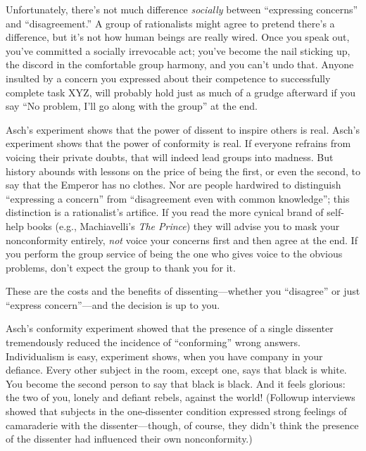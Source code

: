 {
 Unfortunately, there's not much difference
\textit{socially} between ``expressing
concerns'' and
``disagreement.'' A group of
rationalists might agree to pretend there's a
difference, but it's not how human beings are really
wired. Once you speak out, you've committed a socially
irrevocable act; you've become the nail sticking up,
the discord in the comfortable group harmony, and you
can't undo that. Anyone insulted by a concern you
expressed about their competence to successfully complete task XYZ,
will probably hold just as much of a grudge afterward if you say
``No problem, I'll go along with the
group'' at the end.}

{
 Asch's experiment shows that the power of dissent
to inspire others is real. Asch's experiment shows that
the power of conformity is real. If everyone refrains from voicing
their private doubts, that will indeed lead groups into madness. But
history abounds with lessons on the price of being the first, or even
the second, to say that the Emperor has no clothes. Nor are people
hardwired to distinguish ``expressing a
concern'' from ``disagreement even
with common knowledge''; this distinction is a
rationalist's artifice. If you read the more cynical
brand of self-help books (e.g., Machiavelli's
\textit{The Prince}) they will advise you to mask your nonconformity
entirely, \textit{not} voice your concerns first and then agree at the
end. If you perform the group service of being the one who gives voice
to the obvious problems, don't expect the group to
thank you for it.}

{
 These are the costs and the benefits of dissenting---whether you
``disagree'' or just
``express concern''---and the
decision is up to you.}

\myendsectiontext


{
 Asch's conformity experiment showed that the
presence of a single dissenter tremendously reduced the incidence of
``conforming'' wrong answers.
Individualism is easy, experiment shows, when you have company in your
defiance. Every other subject in the room, except one, says that black
is white. You become the second person to say that black is black. And
it feels glorious: the two of you, lonely and defiant rebels, against
the world! (Followup interviews showed that subjects in the
one-dissenter condition expressed strong feelings of camaraderie with
the dissenter---though, of course, they didn't think
the presence of the dissenter had influenced their own nonconformity.)
}

